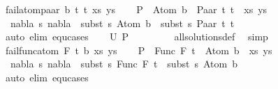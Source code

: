 \begin{isabellebody}
\ {\isacharparenleft}{\kern0pt}fail{\isacharunderscore}{\kern0pt}atom{\isacharunderscore}{\kern0pt}paar\ b\ t{}\ t{}\ xs\ ys{\isacharparenright}{\kern0pt}\isanewline
\ \ \isamarkupfalse%
\ {\isacharquery}{\kern0pt}P\ {\isacharequal}{\kern0pt}\ {\isachardoublequoteopen}{\isacharparenleft}{\kern0pt}Atom\ b\ {\isasymapprox}{\isacharquery}{\kern0pt}\ Paar\ t{}\ t{}\ {\isacharhash}{\kern0pt}\ xs{\isacharcomma}{\kern0pt}\ ys{\isacharparenright}{\kern0pt}{\isachardoublequoteclose}\isanewline
\ \ \isamarkupfalse%
\ {\isachardoublequoteopen}{\isasymnexists}\ nabla\ s{\isachardot}{\kern0pt}\ nabla\ {\isasymturnstile}\ subst\ s\ {\isacharparenleft}{\kern0pt}Atom\ b{\isacharparenright}{\kern0pt}\ {\isasymapprox}\ subst\ s\ {\isacharparenleft}{\kern0pt}Paar\ t{}\ t{}{\isacharparenright}{\kern0pt}{\isachardoublequoteclose}\isanewline
\ \ \ \ \ \isamarkupfalse%
\ {\isacharparenleft}{\kern0pt}auto\ elim{\isacharcolon}{\kern0pt}\ equ{\isachardot}{\kern0pt}cases{\isacharparenright}{\kern0pt}\isanewline
\ \ \isamarkupfalse%
\ {\isachardoublequoteopen}U\ {\isacharquery}{\kern0pt}P\ {\isacharequal}{\kern0pt}\ {\isacharbraceleft}{\kern0pt}{\isacharbraceright}{\kern0pt}{\isachardoublequoteclose}\ \isanewline
\ \ \ \ \isamarkupfalse%
\ all{\isacharunderscore}{\kern0pt}solutions{\isacharunderscore}{\kern0pt}def\ \isamarkupfalse%
\ simp\isanewline
{}\isamarkupfalse%
\isanewline
\ \ \isamarkupfalse%
\ {\isacharparenleft}{\kern0pt}fail{\isacharunderscore}{\kern0pt}func{\isacharunderscore}{\kern0pt}atom\ F\ t{}\ b\ xs\ ys{\isacharparenright}{\kern0pt}\isanewline
\ \ \isamarkupfalse%
\ {\isacharquery}{\kern0pt}P\ {\isacharequal}{\kern0pt}\ {\isachardoublequoteopen}{\isacharparenleft}{\kern0pt}Func\ F\ t{}\ {\isasymapprox}{\isacharquery}{\kern0pt}\ Atom\ b\ {\isacharhash}{\kern0pt}\ xs{\isacharcomma}{\kern0pt}\ ys{\isacharparenright}{\kern0pt}{\isachardoublequoteclose}\isanewline
\ \ \isamarkupfalse%
\ {\isachardoublequoteopen}{\isasymnexists}\ nabla\ s{\isachardot}{\kern0pt}\ nabla\ {\isasymturnstile}\ subst\ s\ {\isacharparenleft}{\kern0pt}Func\ F\ t{}{\isacharparenright}{\kern0pt}\ {\isasymapprox}\ subst\ s\ {\isacharparenleft}{\kern0pt}Atom\ b{\isacharparenright}{\kern0pt}{\isachardoublequoteclose}\isanewline
\ \ \ \ \ \isamarkupfalse%
\ {\isacharparenleft}{\kern0pt}auto\ elim{\isacharcolon}{\kern0pt}\ equ{\isachardot}{\kern0pt}cases{\isacharparenright}{\kern0pt}\isanewline

\end{isabellebody}
